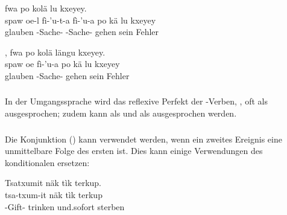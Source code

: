 \begin{interlin} \label{pragma:informal:ex01}
	\glll \Npawl{}   fwa po kolä lu kxeyey. \\
	spaw oe-l fì-'u-t-a fì-'u-a po kä lu kxeyey \\
	glauben  -Sache- -Sache-  gehen sein Fehler \\
\end{interlin}

\begin{interlin} \label{pragma:informal:ex02}
	\glll \Npawl{} , fwa po kolä längu kxeyey. \\
	spaw oe fì-'u-a po kä lu kxeyey \\
	glauben  -Sache-  gehen sein Fehler \\
\end{interlin}

\subsubsection{} In der Umgangssprache wird das reflexive Perfekt der -Verben, , oft als  ausgesprochen; zudem kann  als  und  als  ausgesprochen werden. \\
 

\subsubsection{} Die Konjunktion  () kann verwendet werden, wenn ein zweites Ereignis eine unmittelbare Folge des ersten ist. Dies kann einige Verwendungen des konditionalen  ersetzen:

\begin{interlin}
	\glll \Npawl{}Tsatxumit näk tìk terkup. \\
	tsa-txum-it näk tìk terkup \\
	-Gift- trinken und.sofort sterben \\
\end{interlin}

